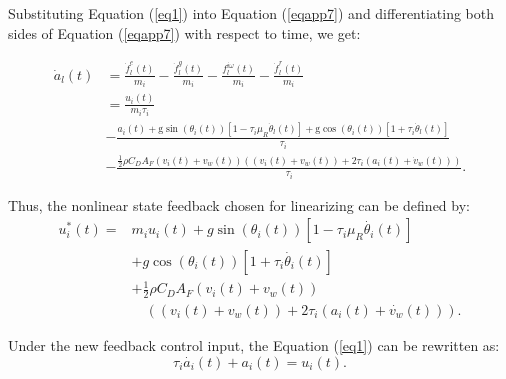 \documentclass[journal]{IEEEtran}
\begin{document}
Substituting Equation (\ref{eq1}) into Equation (\ref{eqapp7}) and differentiating both sides of Equation (\ref{eqapp7}) with respect to time, we get:
\begin{small}
\begin{equation}
  \begin{aligned}
    \dot{a}_{l}(t) & =\frac{\dot{f}_{l}^{e}(t)}{m_{i}}-\frac{\dot{f}_{l}^{g}(t)}{m_{i}}-\frac{f_{l}^{i \omega}(t)}{m_{i}}-\frac{\dot{f}_{l}^{r}(t)}{m_{i}}                                                                                         \\
                   & =               \frac{u_{i}(t)}{m_{i} \tau_{i}}                                                                                                                                                                               \\
                   & -               \frac{a_{i}(t)+\mathrm{g} \sin \left(\theta_{i}(t)\right)\left[1-\tau_{i} \mu_{R} \dot{\theta}_{l}(t)\right]+\mathrm{g} \cos \left(\theta_{i}(t)\right)\left[1+\tau_{i} \dot{\theta}_{l}(t)\right]}{\tau_{i}} \\
                   & -               \frac{\frac{1}{2} \rho C_{D} A_{F}\left(v_{i}(t)+v_{w}(t)\right)\left(\left(v_{i}(t)+v_{w}(t)\right)+2 \tau_{i}\left(a_{i}(t)+\dot{v}_{w}(t)\right)\right)}{\tau_{i}}.
  \end{aligned}
  \label{eqapp8}
\end{equation}
\end{small}

Thus, the nonlinear state feedback chosen for linearizing can be defined by:
\begin{equation}
  \begin{aligned}
    u_i^\ast\left(t\right)= & m_iu_i\left(t\right)+g\sin{\left(\theta_i\left(t\right)\right)}\left[1-\tau_i\mu_R\dot{\theta_i}\left(t\right)\right]\\
    &+g\cos{\left(\theta_i\left(t\right)\right)}\left[1+\tau_i\dot{\theta_i}\left(t\right)\right]\ \\
                            & +\frac{1}{2}\rho C_DA_F\left(v_i\left(t\right)+v_w\left(t\right)\right)\\
                            &\quad \left(\left(v_i\left(t\right)+v_w\left(t\right)\right)+2\tau_i(a_i\left(t\right)+\dot{v_w}\left(t\right))\right).
  \end{aligned}
  \label{eqapp9}
\end{equation}

Under the new feedback control input, the Equation (\ref{eq1}) can be rewritten as:
\begin{equation}
  \tau_i\dot{a_i}\left(t\right)+a_i\left(t\right)=u_i(t).
  \label{eqapp10}
\end{equation}
\end{document}
